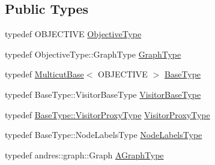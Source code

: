 \subsection*{Public Types}
\begin{DoxyCompactItemize}
\item 
typedef O\+B\+J\+E\+C\+T\+I\+VE \hyperlink{classnifty_1_1graph_1_1opt_1_1multicut_1_1MulticutAndres_aed60c2f4ed9c6c6b97e8b513d7a48e86}{Objective\+Type}
\item 
typedef Objective\+Type\+::\+Graph\+Type \hyperlink{classnifty_1_1graph_1_1opt_1_1multicut_1_1MulticutAndres_adb1adbc514b266aaffc1f7219682966e}{Graph\+Type}
\item 
typedef \hyperlink{classnifty_1_1graph_1_1opt_1_1multicut_1_1MulticutBase}{Multicut\+Base}$<$ O\+B\+J\+E\+C\+T\+I\+VE $>$ \hyperlink{classnifty_1_1graph_1_1opt_1_1multicut_1_1MulticutAndres_ad9aa4942dd45186f3a2ebb38d42876e5}{Base\+Type}
\item 
typedef Base\+Type\+::\+Visitor\+Base\+Type \hyperlink{classnifty_1_1graph_1_1opt_1_1multicut_1_1MulticutAndres_a295da342b6ebe8a8720cadd1dcce2e57}{Visitor\+Base\+Type}
\item 
typedef \hyperlink{classnifty_1_1graph_1_1opt_1_1common_1_1SolverBase_ad209b469b3bc9fc0fc14e9fed4d09075}{Base\+Type\+::\+Visitor\+Proxy\+Type} \hyperlink{classnifty_1_1graph_1_1opt_1_1multicut_1_1MulticutAndres_a898fcb16a25facde8ba763b27a331bda}{Visitor\+Proxy\+Type}
\item 
typedef Base\+Type\+::\+Node\+Labels\+Type \hyperlink{classnifty_1_1graph_1_1opt_1_1multicut_1_1MulticutAndres_a6cd9d64abc4a98aa9745ce1ef0d4ecfe}{Node\+Labels\+Type}
\item 
typedef andres\+::graph\+::\+Graph \hyperlink{classnifty_1_1graph_1_1opt_1_1multicut_1_1MulticutAndres_a0d2a06934455d278149370b1dbcb3953}{A\+Graph\+Type}
\end{DoxyCompactItemize}
